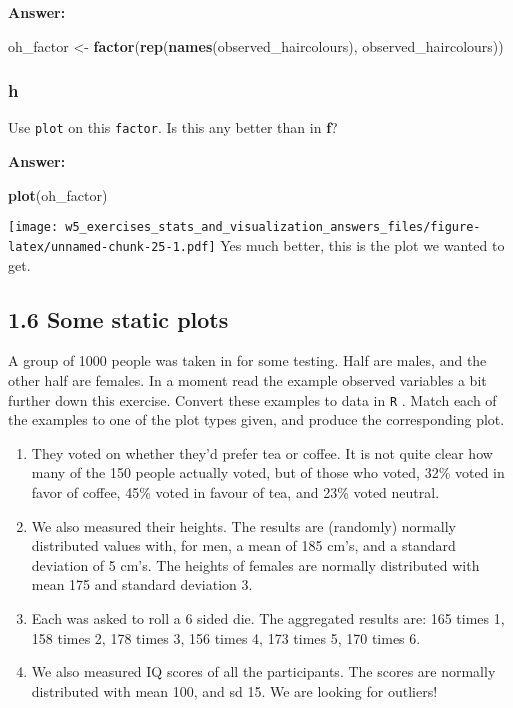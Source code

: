 \documentclass[]{article}
\newenvironment{Shaded}{\begin{snugshade}}{\end{snugshade}}
\newcommand{\KeywordTok}[1]{\textcolor[rgb]{0.13,0.29,0.53}{\textbf{#1}}}
\newcommand{\NormalTok}[1]{#1}
\newcommand{\StringTok}[1]{\textcolor[rgb]{0.31,0.60,0.02}{#1}}
\providecommand{\tightlist}{%
  \setlength{\itemsep}{0pt}\setlength{\parskip}{0pt}}
\begin{document}
\textbf{Answer:}

\begin{Shaded}
\begin{Highlighting}[]
\NormalTok{oh_factor <-}\StringTok{ }\KeywordTok{factor}\NormalTok{(}\KeywordTok{rep}\NormalTok{(}\KeywordTok{names}\NormalTok{(observed_haircolours), observed_haircolours))}
\end{Highlighting}
\end{Shaded}

\hypertarget{h}{%
\subsubsection{h}\label{h}}

Use \texttt{plot} on this \texttt{factor}. Is this any better than in
\textbf{f}?

\textbf{Answer:}

\begin{Shaded}
\begin{Highlighting}[]
\KeywordTok{plot}\NormalTok{(oh_factor)}
\end{Highlighting}
\end{Shaded}

\texttt{[image: w5\_exercises\_stats\_and\_visualization\_answers\_files/figure-latex/unnamed-chunk-25-1.pdf]}
Yes much better, this is the plot we wanted to get.

\hypertarget{some-static-plots}{%
\subsection{1.6 Some static plots}\label{some-static-plots}}

A group of 1000 people was taken in for some testing. Half are males,
and the other half are females. In a moment read the example observed
variables a bit further down this exercise. Convert these examples to
data in \texttt{R} . Match each of the examples to one of the plot types
given, and produce the corresponding plot.

\begin{enumerate}
\def\labelenumi{\arabic{enumi}.}
\tightlist
\item
  They voted on whether they'd prefer tea or coffee. It is not quite
  clear how many of the 150 people actually voted, but of those who
  voted, 32\% voted in favor of coffee, 45\% voted in favour of tea, and
  23\% voted neutral.
\item
  We also measured their heights. The results are (randomly) normally
  distributed values with, for men, a mean of 185 cm's, and a standard
  deviation of 5 cm's. The heights of females are normally distributed
  with mean 175 and standard deviation 3.
\item
  Each was asked to roll a 6 sided die. The aggregated results are: 165
  times 1, 158 times 2, 178 times 3, 156 times 4, 173 times 5, 170 times
  6.
\item
  We also measured IQ scores of all the participants. The scores are
  normally distributed with mean 100, and sd 15. We are looking for
  outliers!
\end{enumerate}
\end{document}
